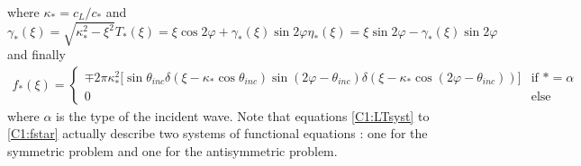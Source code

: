 where $\kappa_*=c_L/c_*$ and
\begin{subequations}
\begin{equation}
\gamma_*(\xi)=\sqrt{\kappa_*^2-\xi^2}
\end{equation}
\begin{equation}
T_*(\xi)=\xi\cos 2\varphi+\gamma_*(\xi)\sin 2\varphi
\end{equation}
\begin{equation}
\eta_*(\xi)=\xi\sin 2\varphi-\gamma_*(\xi)\sin 2\varphi
\end{equation}
\end{subequations}
and finally
\begin{eqnarray}
f_*(\xi)=\left\{
\begin{array}{cc}
\mp2\pi\kappa_*^2\lbrack \sin\theta_{inc}\delta(\xi-\kappa_*\cos\theta_{inc})\sin(2\varphi-\theta_{inc})\delta(\xi-\kappa_*\cos(2\varphi-\theta_{inc}))\rbrack & \mbox{if } *=\alpha \\
0&\mbox{else}
\end{array}
\right.
\label{C1:fstar}
\end{eqnarray}
where $\alpha$ is the type of the incident wave. Note that equations \eqref{C1:LTsyst} to \eqref{C1:fstar} actually describe two systems of functional equations : one for the symmetric problem and one for the antisymmetric problem.

